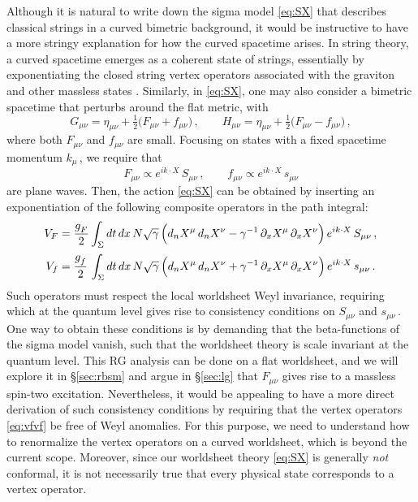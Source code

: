 \documentclass[11pt]{article}
\newcommand{\be}{\begin{equation}}
\newcommand{\ee}{\end{equation}}
\newcommand{\p}{\partial}
\begin{document}
Although it is natural to write down the sigma model \eqref{eq:SX} that describes classical strings in a curved bimetric background, it would be instructive to have a more stringy explanation for how the curved spacetime arises.
In string theory, a curved spacetime emerges as a coherent state of strings, essentially by exponentiating the closed string vertex operators associated with the graviton and other massless states \cite{Green:1987sp, Polchinski:1998rq}. Similarly, in \eqref{eq:SX}, one may also consider a bimetric spacetime that perturbs around the flat metric, with
%
\be \label{eq:ghf}
	G_{\mu\nu} = \eta_{\mu\nu} + \tfrac{1}{2} \bigl( F_{\mu\nu} + f_{\mu\nu} \bigr)\,,
		\qquad%
	H_{\mu\nu} = \eta_{\mu\nu} + \tfrac{1}{2} \bigl( F_{\mu\nu} - f_{\mu\nu} \bigr)\,,
\ee
%
where both $F_{\mu\nu}$ and $f_{\mu\nu}$ are small. Focusing on states with a fixed spacetime  momentum $k_\mu$\,,  we require that
%
\be
	F_{\mu\nu} \propto e^{i k \cdot X} \, S_{\mu\nu}\,,
		\qquad%
	f_{\mu\nu} \propto e^{i k \cdot X} \, s_{\mu\nu}
\ee
%
are plane waves.
Then, the action \eqref{eq:SX} can be obtained by inserting an exponentiation of the following composite operators in the path integral:
%
\begin{subequations} \label{eq:vfvf}
\begin{align}
	V_F & = \frac{g^{}_F}{2} \int_\Sigma dt \, dx \, N \sqrt{\gamma} \, \Bigl( d_n X^\mu \, d_n X^\nu - \gamma^{-1} \, \p_x X^\mu \, \p_x X^\nu \Bigr) \, e^{i k \cdot X} \, S_{\mu\nu}\,, \label{eq:VF} \\[2pt]
	V_f & = \frac{g^{}_f}{2} \, \int_\Sigma dt \, dx \, N \sqrt{\gamma} \, \Bigl( d_n X^\mu \, d_n X^\nu + \gamma^{-1} \, \p_x X^\mu \, \p_x X^\nu \Bigr) \, e^{i k \cdot X} \, s_{\mu\nu}\,. \label{eq:vf}	
\end{align}
\end{subequations}
%
Such operators must respect the local worldsheet Weyl invariance, requiring which at the quantum level gives rise to consistency conditions on $S_{\mu\nu}$ and $s_{\mu\nu}$\,. One way to obtain these conditions is by demanding that the beta-functions of the sigma model vanish, such that the worldsheet theory is scale invariant at the quantum level. This RG analysis can be done on a flat worldsheet, and we will explore it in \S\ref{sec:rbsm} and argue in \S\ref{sec:lg} that $F_{\mu\nu}$ gives rise to a massless spin-two excitation. Nevertheless, it would be appealing to have a more direct derivation of such consistency conditions by requiring that the vertex operators \eqref{eq:vfvf} be free of Weyl anomalies. For this purpose, we need to understand how to renormalize the vertex operators on a curved worldsheet, which is beyond the current scope.   
Moreover, since our worldsheet theory \eqref{eq:SX} is generally \emph{not} conformal, it is not necessarily true that every physical state corresponds to a vertex operator.
\end{document}
